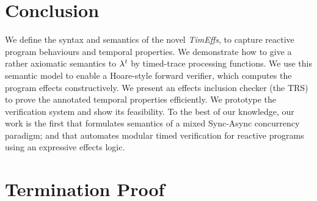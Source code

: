 \documentclass[acmsmall,10pt,review]{acmart}
\newcommand{\timedEffects}{\emph{TimEffs}}
\newcommand{\code}[1]{{\tt{\ensuremath{\m{#1}}}}}
\newcommand{\m}{\mathit}
\newcommand{\timedL}{\code{\lambda^{t}}}
\begin{document}
\section{Conclusion}
\label{sec:conclusion}
We define the syntax and semantics of the novel \timedEffects, to capture reactive program behaviours and  temporal properties. We demonstrate how to give a rather axiomatic semantics to \code{\timedL} by timed-trace processing functions. We use this semantic model to enable  a Hoare-style forward verifier,  which computes the program effects constructively.
We present an effects inclusion checker (the TRS) to prove the annotated temporal properties efficiently. We prototype the verification system and show its feasibility.
To the best of our knowledge, our work is the first that formulates semantics of a mixed Sync-Async concurrency paradigm; and that automates modular timed verification for reactive programs using an expressive effects logic. 










\appendix

\section{Termination Proof}  \label{proof:TerminationProof}
\end{document}
